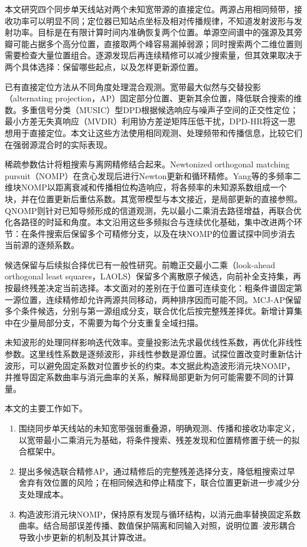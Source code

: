 \documentclass[a4paper,fleqn]{cas-sc}
\numberwithin{equation}{section}
\numberwithin{figure}{section}
\numberwithin{table}{section}
\begin{document}
本文研究四个同步单天线站对两个未知宽带源的直接定位。两源占用相同频带，接收功率可以明显不同；定位器已知站点坐标及相对传播规律，不知道发射波形与发射功率。目标是在有限计算时间内准确恢复两个位置。单源空间谱中的强源及其旁瓣可能占据多个高分位置，直接取两个峰容易漏掉弱源；同时搜索两个二维位置则需要检查大量位置组合。逐源发现后再连续精修可以减少搜索量，但其效果取决于两个具体选择：保留哪些起点，以及怎样更新源位置。

已有直接定位方法从不同角度处理混合观测。宽带最大似然与交替投影（alternating projection，AP）固定部分位置、更新其余位置，降低联合搜索的维数\cite{ChenHudsonYao2002}。多重信号分类（MUSIC）型DPD根据候选响应与噪声子空间的正交性定位\cite{WeissAmar2005}；最小方差无失真响应（MVDR）利用协方差逆矩阵压低干扰\cite{Capon1969}，DPD-HR将这一思想用于直接定位\cite{TirerWeiss2016}。本文让这些方法使用相同观测、处理频带和传播信息，比较它们在强弱源混合时的实际表现。

稀疏参数估计将粗搜索与离网精修结合起来。Newtonized orthogonal matching pursuit（NOMP）在贪心发现后进行Newton更新和循环精修\cite{Mamandipoor2016}。Yang等的多频率二维块NOMP以距离衰减和传播相位构造响应，将各频率的未知源系数组成一个块，并在位置更新后重估系数\cite{Yang2022}。其宽带模型与本文接近，是局部更新的直接参照。QNOMP则针对已知导频形成的信道观测，先以最小二乘消去路径增益，再联合优化各路径的时延和角度\cite{Zeng2025}。本文沿用这些多频拟合与连续优化基础，集中改进两个环节：在条件搜索后保留多个可精修分支，以及在块NOMP的位置试探中同步消去当前源的逐频系数。

候选保留与后续拟合择优已有一般性研究。前瞻正交最小二乘（look-ahead orthogonal least squares，LAOLS）保留多个离散原子候选，向前补全支持集，再按最终残差决定当前选择\cite{Chatterjee2012}。本文面对的差别在于位置可连续变化：粗条件谱固定第一源位置，连续精修却允许两源共同移动，两种排序因而可能不同。MCJ-AP保留多个条件候选，分别与第一源组成分支，联合优化后按完整残差择优。新增计算集中在少量局部分支，不需要为每个分支重复全域扫描。

未知波形的处理同样影响迭代效率。变量投影法先求最优线性系数，再优化非线性参数\cite{GolubPereyra1973}。这里线性系数是逐频波形，非线性参数是源位置。试探位置改变时重新估计波形，可以避免固定系数对位置步长的约束。本文据此构造波形消元块NOMP，并推导固定系数曲率与消元曲率的关系，解释局部更新为何可能需要不同的计算量。

本文的主要工作如下。
\begin{enumerate}
  \item 围绕同步单天线站的未知宽带强弱重叠源，明确观测、传播和接收功率定义，以宽带最小二乘消元为基础，将条件搜索、残差发现和位置精修置于统一的拟合框架中。
  \item 提出多候选联合精修AP，通过精修后的完整残差选择分支，降低粗搜索过早舍弃有效位置的风险；在相同候选和停止精度下，联合位置更新进一步减少分支处理成本。
  \item 构造波形消元块NOMP，保持原有发现与循环结构，以消元曲率替换固定系数曲率。结合局部误差传播、数值保护隔离和同输入对照，说明位置--波形耦合导致小步更新的机制及其计算改进。
\end{enumerate}
\end{document}
